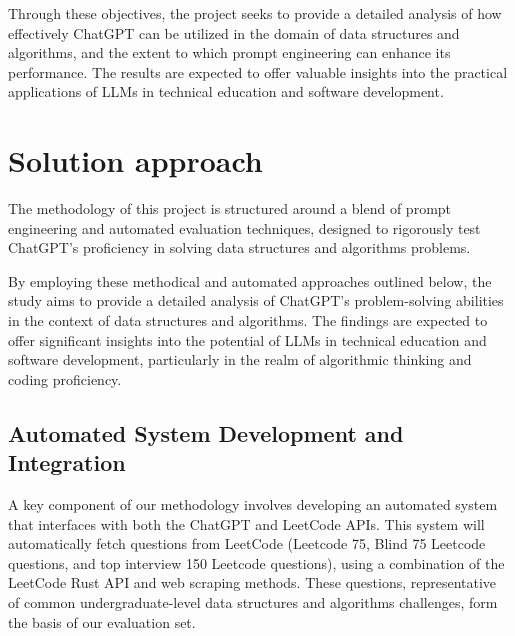 Through these objectives, the project seeks to provide a detailed analysis of how effectively ChatGPT can be utilized in the domain of data structures and algorithms, and the extent to which prompt engineering can enhance its performance. The results are expected to offer valuable insights into the practical applications of LLMs in technical education and software development.









\section{Solution approach}
\label{sec:intro_sol} %

The methodology of this project is structured around a blend of prompt engineering and automated evaluation techniques, designed to rigorously test ChatGPT's proficiency in solving data structures and algorithms problems.

By employing these methodical and automated approaches outlined below, the study aims to provide a detailed analysis of ChatGPT's problem-solving abilities in the context of data structures and algorithms. The findings are expected to offer significant insights into the potential of LLMs in technical education and software development, particularly in the realm of algorithmic thinking and coding proficiency.

\subsection{Automated System Development and Integration}
\label{sec:intro_some_sub1}
A key component of our methodology involves developing an automated system that interfaces with both the ChatGPT and LeetCode APIs. This system will automatically fetch questions from LeetCode (Leetcode 75, Blind 75 Leetcode questions, and top interview 150 Leetcode questions), using a combination of the LeetCode Rust API and web scraping methods. These questions, representative of common undergraduate-level data structures and algorithms challenges, form the basis of our evaluation set.

